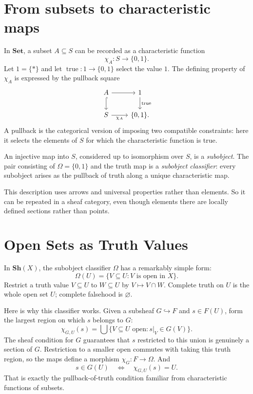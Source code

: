 \section{From subsets to characteristic maps}

In \(\mathbf{Set}\), a subset \(A\subseteq S\) can be recorded as a characteristic function
\[
 \chi_A:S\to\{0,1\}.
\]
Let \(1=\{*\}\) and let \(\operatorname{true}:1\to\{0,1\}\) select the value \(1\). The defining property of \(\chi_A\) is expressed by the pullback square
\[
 \begin{tikzcd}
 A\arrow[r]\arrow[d,hook] &1\arrow[d,"\operatorname{true}"]\\
 S\arrow[r,"\chi_A"'] &\{0,1\}.
 \end{tikzcd}
\]
A pullback is the categorical version of imposing two compatible constraints: here it selects the elements of \(S\) for which the characteristic function is true.

An injective map into \(S\), considered up to isomorphism over \(S\), is a \emph{subobject}. The pair consisting of \(\Omega=\{0,1\}\) and the truth map is a \emph{subobject classifier}: every subobject arises as the pullback of truth along a unique characteristic map.

This description uses arrows and universal properties rather than elements. So it can be repeated in a sheaf category, even though elements there are locally defined sections rather than points.

\section{Open Sets as Truth Values}

In \(\mathbf{Sh}(X)\), the subobject classifier \(\Omega\) has a remarkably simple form:
\[
 \boxed{\Omega(U)=
 \{V\subseteq U:V\text{ is open in }X\}.}
\]
Restrict a truth value \(V\subseteq U\) to \(W\subseteq U\) by \(V\mapsto V\cap W\). Complete truth on \(U\) is the whole open set \(U\); complete falsehood is \(\varnothing\).

Here is why this classifier works. Given a subsheaf \(G\hookrightarrow F\) and \(s\in F(U)\), form the largest region on which \(s\) belongs to \(G\):
\[
 \boxed{\chi_{G,U}(s)=
 \bigcup\{V\subseteq U\text{ open}:s|_V\in G(V)\}.}
\]
The sheaf condition for \(G\) guarantees that \(s\) restricted to this union is genuinely a section of \(G\). Restriction to a smaller open commutes with taking this truth region, so the maps define a morphism \(\chi_G:F\to\Omega\). And
\[
 s\in G(U)\quad\Longleftrightarrow\quad
 \chi_{G,U}(s)=U.
\]
That is exactly the pullback-of-truth condition familiar from characteristic functions of subsets.

